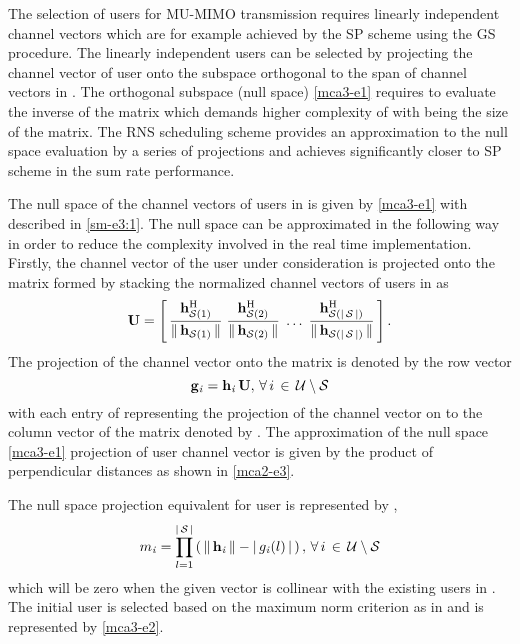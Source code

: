 
The selection of users for MU-MIMO transmission requires linearly independent channel vectors which are for example achieved by the \ac{SP} scheme using the \ac{GS} procedure. The linearly independent users can be selected by projecting the channel vector of user  onto the subspace orthogonal to the span of channel vectors in . The orthogonal subspace (null space) \eqref{mca3-e1} requires to evaluate the inverse of the matrix which demands higher complexity of  with  being the size of the matrix. The \ac{RNS} scheduling scheme provides an approximation to the null space evaluation by a series of projections and achieves significantly closer to \ac{SP} scheme in the sum rate performance.

The null space of the channel vectors of users in  is given by \eqref{mca3-e1} with  described in \eqref{sm-e3:1}. The null space can be approximated in the following way in order to reduce the complexity involved in the real time implementation. Firstly, the channel vector of the user  under consideration is projected onto the matrix  formed by stacking the normalized channel vectors of users in  as
\begin{equation}
\mbf{U} = \matscont{ \frac{\mvecnxy{h}{\mc{S}(1)}^\mrm{H}}{\gnorm{\mvecnxy{h}{\mc{S}(1)}}} \; \frac{\mvecnxy{h}{\mc{S}(2)}^\mrm{H}}{\gnorm{\mvecnxy{h}{\mc{S}(2)}}} \; \dotsc \; \frac{\mvecnxy{h}{\mc{S}(\card{\mc{S}})}^\mrm{H}}{\gnorm{\mvecnxy{h}{\mc{S}(\card{\mc{S}})}}}}.
\label{mca2-e1}
\end{equation}
The projection of the channel vector  onto the matrix  is denoted by the row vector 
\begin{equation}
\mvecxy{g}{i} = \mvecxy{h}{i} \, \mbf{U}, \fall i \inm \mc{U} \bs \mc{S}
\label{mca2-e2}
\end{equation}
with each entry of  representing the projection of the channel vector  on to the  column vector of the matrix  denoted by . The approximation of the null space \eqref{mca3-e1} projection of  user channel vector is given by the product of perpendicular distances as shown in \eqref{mca2-e3}.

The null space projection equivalent for user  is represented by ,
\begin{equation}
\msclxy{m}{i} = \prod^{\card{\mc{S}}}_{l = 1} \left ( \, \gnorm{\mvecxy{h}{i}} - \card{\msclxy{g}{i}(l)} \, \right ), \fall i \inm \mc{U} \bs \mc{S}
\label{mca2-e3}
\end{equation}
which will be zero when the given vector is collinear with the existing users in . The initial user is selected based on the maximum norm criterion as in \cite{sus2006zfbf} and is represented by \eqref{mca3-e2}.

